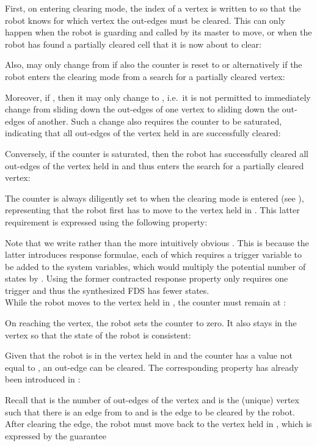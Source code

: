 First, on entering clearing mode, the index of a vertex is written to  so that the robot knows for which vertex the out-edges must be cleared. This can only happen when the robot is guarding and called by its master to move, or when the robot has found a partially cleared cell that it is now about to clear:

Also,  may only change from  if also the counter  is reset to  or alternatively if the robot enters the clearing mode from a search for a partially cleared vertex:

Moreover, if , then it may only change to , i.e.\ it is not permitted to immediately change from sliding down the out-edges of one vertex to sliding down the out-edges of another. Such a change also requires the counter  to be saturated, indicating that all out-edges of the vertex held in  are successfully cleared:

Conversely, if the counter  is saturated, then the robot has successfully cleared all out-edges of the vertex held in  and thus enters the search for a partially cleared vertex:


The counter  is always diligently set to  when the clearing mode is entered (see ), representing that the robot first has to move to the vertex held in . This latter requirement is expressed using the following property:

Note that we write  rather than the more intuitively obvious . This is because the latter introduces  response formulae, each of which requires a trigger variable to be added to the system variables, which would multiply the potential number of states by . Using the former contracted response property only requires one trigger and thus the synthesized FDS has fewer states.\\

While the robot moves to the vertex held in , the counter  must remain at :
	
On reaching the vertex, the robot sets the counter to zero. It also stays in the vertex so that the state of the robot is consistent:


Given that the robot is in the vertex held in  and the counter  has a value not equal to , an out-edge can be cleared. The corresponding property has already been introduced in :

Recall that  is the number of out-edges of the vertex  and  is the (unique) vertex such that there is an edge  from  to  and  is the  edge to be cleared by the robot. After clearing the edge, the robot must move back to the vertex held in , which is expressed by the guarantee

